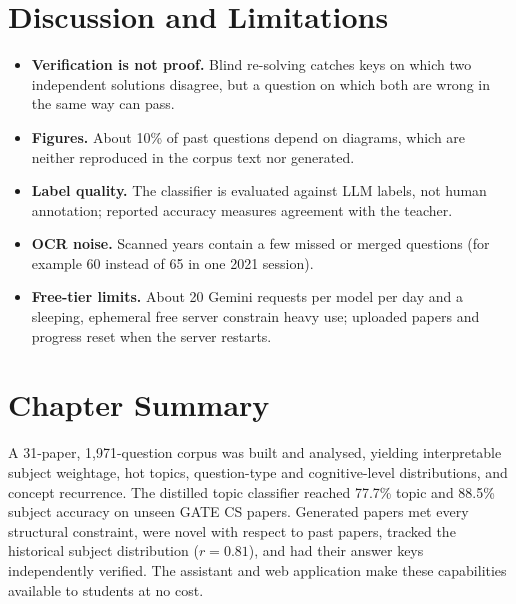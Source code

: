 \section{Discussion and Limitations}
\begin{itemize}
  \item \textbf{Verification is not proof.} Blind re-solving catches keys on which two independent solutions disagree,
        but a question on which both are wrong in the same way can pass.
  \item \textbf{Figures.} About 10\% of past questions depend on diagrams, which are neither reproduced in the corpus
        text nor generated.
  \item \textbf{Label quality.} The classifier is evaluated against LLM labels, not human annotation; reported accuracy
        measures agreement with the teacher.
  \item \textbf{OCR noise.} Scanned years contain a few missed or merged questions (for example 60 instead of 65 in one
        2021 session).
  \item \textbf{Free-tier limits.} About 20 Gemini requests per model per day and a sleeping, ephemeral free server
        constrain heavy use; uploaded papers and progress reset when the server restarts.
\end{itemize}

\section{Chapter Summary}
A 31-paper, 1,971-question corpus was built and analysed, yielding interpretable subject weightage, hot topics,
question-type and cognitive-level distributions, and concept recurrence. The distilled topic classifier reached 77.7\%
topic and 88.5\% subject accuracy on unseen GATE CS papers. Generated papers met every structural constraint, were novel
with respect to past papers, tracked the historical subject distribution ($r=0.81$), and had their answer keys
independently verified. The assistant and web application make these capabilities available to students at no cost.
